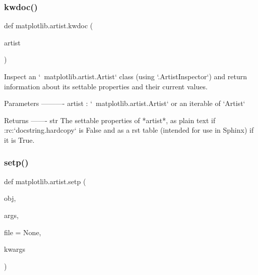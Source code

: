 \subsubsection{\texorpdfstring{kwdoc()}{kwdoc()}}
{\footnotesize\ttfamily def matplotlib.\+artist.\+kwdoc (\begin{DoxyParamCaption}\item[{}]{artist }\end{DoxyParamCaption})}

\begin{DoxyVerb}Inspect an `~matplotlib.artist.Artist` class (using `.ArtistInspector`) and
return information about its settable properties and their current values.

Parameters
----------
artist : `~matplotlib.artist.Artist` or an iterable of `Artist`\s

Returns
-------
str
    The settable properties of *artist*, as plain text if
    :rc:`docstring.hardcopy` is False and as a rst table (intended for
    use in Sphinx) if it is True.
\end{DoxyVerb}
 \mbox{\label{namespacematplotlib_1_1artist_a9ff399f3e188b91146776186bc5e58d0}} 
\subsubsection{\texorpdfstring{setp()}{setp()}}
{\footnotesize\ttfamily def matplotlib.\+artist.\+setp (\begin{DoxyParamCaption}\item[{}]{obj,  }\item[{}]{args,  }\item[{}]{file = {\ttfamily None},  }\item[{}]{kwargs }\end{DoxyParamCaption})}

